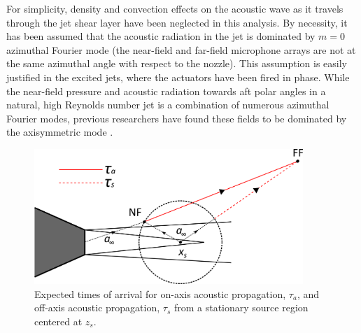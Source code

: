 For simplicity, density and convection effects on the acoustic wave as it travels through the jet shear layer have been neglected in this analysis. 
By necessity, it has been assumed that the acoustic radiation in the jet is dominated by $m = 0$ azimuthal Fourier mode (the near-field and far-field microphone arrays are not at the same azimuthal angle with respect to the nozzle). 
This assumption is easily justified in the excited jets, where the actuators have been fired in phase. 
While the near-field pressure and acoustic radiation towards aft polar angles in a natural, high Reynolds number jet is a combination of numerous azimuthal Fourier modes, previous researchers have found these fields to be dominated by the axisymmetric mode \citep{Arndt1997,Hall2006,Koenig2013,Juve1979}.
\begin{figure}
	\centering
	\includegraphics[width=4in]{Figures/ToA_tau.png}
	\caption{Expected times of arrival for on-axis acoustic propagation, $\tau_a$, and off-axis acoustic propagation, $\tau_s$ from a stationary source region centered at $z_s$.}
	\label{fig:ch3_ToA}
\end{figure}

